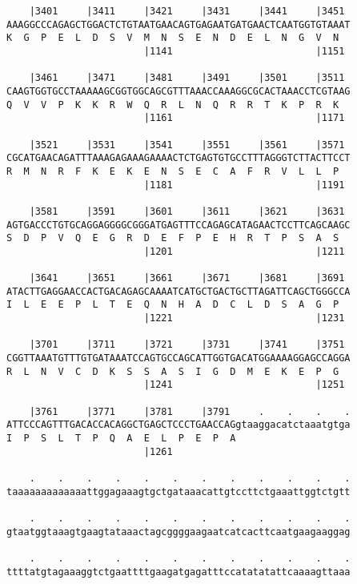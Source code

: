 \documentclass{article}
\begin{document}
\begin{Verbatim}
    |3401     |3411     |3421     |3431     |3441     |3451 
AAAGGCCCAGAGCTGGACTCTGTAATGAACAGTGAGAATGATGAACTCAATGGTGTAAAT
K  G  P  E  L  D  S  V  M  N  S  E  N  D  E  L  N  G  V  N  
                        |1141                         |1151 
  
    |3461     |3471     |3481     |3491     |3501     |3511 
CAAGTGGTGCCTAAAAAGCGGTGGCAGCGTTTAAACCAAAGGCGCACTAAACCTCGTAAG
Q  V  V  P  K  K  R  W  Q  R  L  N  Q  R  R  T  K  P  R  K  
                        |1161                         |1171 
  
    |3521     |3531     |3541     |3551     |3561     |3571 
CGCATGAACAGATTTAAAGAGAAAGAAAACTCTGAGTGTGCCTTTAGGGTCTTACTTCCT
R  M  N  R  F  K  E  K  E  N  S  E  C  A  F  R  V  L  L  P  
                        |1181                         |1191 
  
    |3581     |3591     |3601     |3611     |3621     |3631 
AGTGACCCTGTGCAGGAGGGGCGGGATGAGTTTCCAGAGCATAGAACTCCTTCAGCAAGC
S  D  P  V  Q  E  G  R  D  E  F  P  E  H  R  T  P  S  A  S  
                        |1201                         |1211 
  
    |3641     |3651     |3661     |3671     |3681     |3691 
ATACTTGAGGAACCACTGACAGAGCAAAATCATGCTGACTGCTTAGATTCAGCTGGGCCA
I  L  E  E  P  L  T  E  Q  N  H  A  D  C  L  D  S  A  G  P  
                        |1221                         |1231 
  
    |3701     |3711     |3721     |3731     |3741     |3751 
CGGTTAAATGTTTGTGATAAATCCAGTGCCAGCATTGGTGACATGGAAAAGGAGCCAGGA
R  L  N  V  C  D  K  S  S  A  S  I  G  D  M  E  K  E  P  G  
                        |1241                         |1251 
  
    |3761     |3771     |3781     |3791     .    .    .    .
ATTCCCAGTTTGACACCACAGGCTGAGCTCCCTGAACCAGgtaaggacatctaaatgtga
I  P  S  L  T  P  Q  A  E  L  P  E  P  A                    
                        |1261                               
  
    .    .    .    .    .    .    .    .    .    .    .    .
taaaaaaaaaaaaattggagaaagtgctgataaacattgtccttctgaaattggtctgtt
                                                            
    .    .    .    .    .    .    .    .    .    .    .    .
gtaatggtaaagtgaagtataaactagcggggaagaatcatcacttcaatgaagaaggag
                                                            
    .    .    .    .    .    .    .    .    .    .    .    .
ttttatgtagaaaggtctgaattttgaagatgagatttccatatatattcaaaagttaaa
                                                            

\end{Verbatim}
\end{document}
